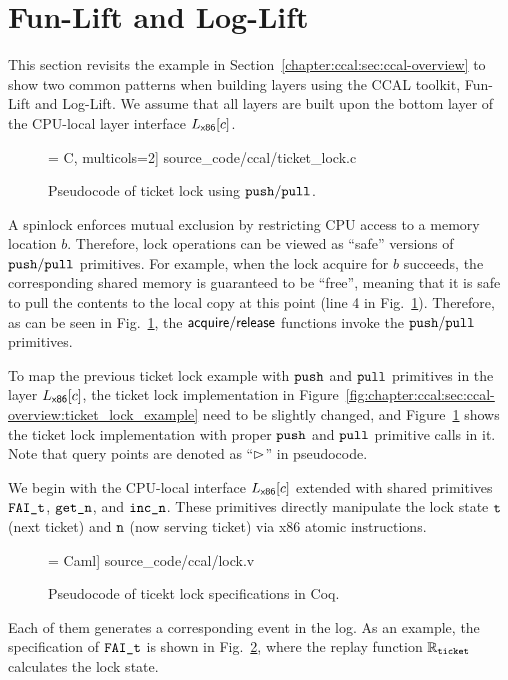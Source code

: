 \section{Fun-Lift and Log-Lift}
\label{chapter:ccal:sec:example}

This section revisits the example in Section~\ref{chapter:ccal:sec:ccal-overview} to show two common patterns 
when building layers using the CCAL toolkit, Fun-Lift and Log-Lift. 
We assume that all layers are built upon the bottom layer of the CPU-local layer interface
$L_\mathsf{x86}[c]$.

\begin{figure}[t]
 = C, multicols=2] {source_code/ccal/ticket_lock.c}
\caption{Pseudocode of ticket lock using ${\mathrm{\texttt{push}}}/{\mathrm{\texttt{pull}}}$.}
\label{fig:exp:real_ticket_lock}
\end{figure}




A spinlock enforces mutual exclusion by restricting CPU access to
a memory location $b$. Therefore, lock operations can be viewed
as ``safe'' versions of ${\mathrm{\texttt{push}}}/{\mathrm{\texttt{pull}}}$ primitives.
For example, when the lock acquire  for $b$ succeeds,
the corresponding shared memory is guaranteed
to be ``free'', meaning that it is safe to 
pull the contents to the local copy at this point (line 4 in Fig.~\ref{fig:exp:real_ticket_lock}).
Therefore, as can be seen in Fig.~\ref{fig:exp:real_ticket_lock},
the $\mathsf{acquire}/\mathsf{release}$ functions invoke the ${\mathrm{\texttt{push}}}/{\mathrm{\texttt{pull}}}$ primitives.

To map the previous ticket lock example with ${\mathrm{\texttt{push}}}$ and ${\mathrm{\texttt{pull}}}$ primitives in the layer $L_\mathsf{x86}[c]$, 
the ticket lock implementation in Figure~\ref{fig:chapter:ccal:sec:ccal-overview:ticket_lock_example} need to be slightly changed, and
Figure~\ref{fig:exp:real_ticket_lock} shows the ticket lock implementation with proper ${\mathrm{\texttt{push}}}$ and ${\mathrm{\texttt{pull}}}$ primitive calls in it.
Note that query points are denoted as ``$\rhd$'' in pseudocode.

We begin with the CPU-local interface $L_\mathsf{x86}[c]$ extended with shared primitives
${\mathrm{\texttt{FAI\_t}}}$, ${\mathrm{\texttt{get\_n}}}$, and ${\mathrm{\texttt{inc\_n}}}$.
These primitives directly manipulate the lock state ${\mathrm{\texttt{t}}}$
(next ticket) and ${\mathrm{\texttt{n}}}$ (now serving ticket)
via x86 atomic instructions. 

\begin{figure}[t]
 = Caml] {source_code/ccal/lock.v}
\caption{Pseudocode of ticekt lock specifications in Coq.}
\label{fig:exp:tlock}
\end{figure}
Each of them generates a corresponding event in the 
log. As an example, the specification of ${\mathrm{\texttt{FAI\_t}}}$ is shown in Fig.~\ref{fig:exp:tlock},
where the replay function $\mathbb{R}_{{\mathrm{\texttt{ticket}}}}$ calculates  the lock state.
 
